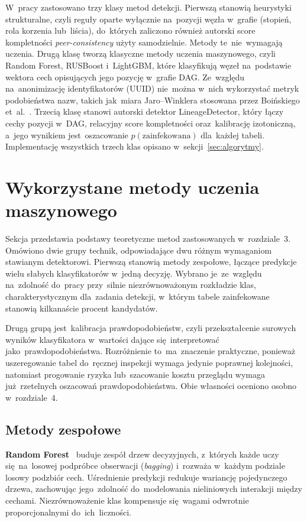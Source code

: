 \documentclass[polish,master,a4paper,oneside]{ppfcmthesis}
\renewcommand{\_}{\origtextunderscore\ifmmode\else\allowbreak\fi}
\begin{document}
W~pracy zastosowano trzy klasy metod detekcji. Pierwszą stanowią heurystyki
strukturalne, czyli reguły oparte wyłącznie na~pozycji węzła w~grafie
(stopień, rola korzenia lub~liścia), do~których zaliczono również autorski
score kompletności \emph{peer-consistency} użyty samodzielnie. Metody te~nie~wymagają
uczenia. Drugą klasę tworzą klasyczne metody uczenia maszynowego, czyli
Random Forest, RUSBoost i~LightGBM, które klasyfikują węzeł na~podstawie
wektora cech opisujących jego pozycję w~grafie DAG. Ze~względu
na~anonimizację identyfikatorów (UUID) nie~można w~nich wykorzystać metryk
podobieństwa nazw, takich jak~miara Jaro–Winklera stosowana przez Boińskiego
et~al.~\cite{Boinski2025}. Trzecią klasę stanowi autorski detektor
LineageDetector, który łączy cechy pozycji w~DAG, relacyjny score
kompletności oraz~kalibrację izotoniczną, a~jego wynikiem jest~oszacowanie
$p(\text{zainfekowana})$ dla~każdej tabeli. Implementację wszystkich trzech
klas opisano w~sekcji~\ref{sec:algorytmy}.


\section{Wykorzystane metody uczenia maszynowego}
\label{sec:metody-ml}

Sekcja przedstawia podstawy teoretyczne metod zastosowanych w~rozdziale~3.
Omówiono dwie grupy technik, odpowiadające dwu różnym wymaganiom stawianym
detektorowi. Pierwszą stanowią metody zespołowe, łączące predykcje wielu
słabych klasyfikatorów w~jedną decyzję. Wybrano je~ze~względu na~zdolność
do~pracy przy~silnie niezrównoważonym rozkładzie klas, charakterystycznym
dla~zadania detekcji, w~którym tabele zainfekowane stanowią kilkanaście procent
kandydatów.

Drugą grupą jest~kalibracja prawdopodobieństw, czyli przekształcenie surowych
wyników klasyfikatora w~wartości dające się~interpretować jako~prawdopodobieństwa.
Rozróżnienie to~ma~znaczenie praktyczne, ponieważ uszeregowanie tabel do~ręcznej
inspekcji wymaga jedynie poprawnej kolejności, natomiast progowanie ryzyka
lub~szacowanie kosztu przeglądu wymaga już~rzetelnych oszacowań
prawdopodobieństwa. Obie własności oceniono osobno w~rozdziale~4.

\subsection{Metody zespołowe}

\noindent\textbf{Random Forest}~\cite{Breiman2001} buduje zespół drzew
decyzyjnych, z~których każde uczy się~na~losowej podpróbce obserwacji
(\emph{bagging}) i~rozważa w~każdym podziale losowy podzbiór cech.
Uśrednienie predykcji redukuje wariancję pojedynczego drzewa, zachowując
jego~zdolność do~modelowania nieliniowych interakcji między cechami.
Niezrównoważenie klas kompensuje się~wagami odwrotnie proporcjonalnymi
do~ich~liczności.
\end{document}
